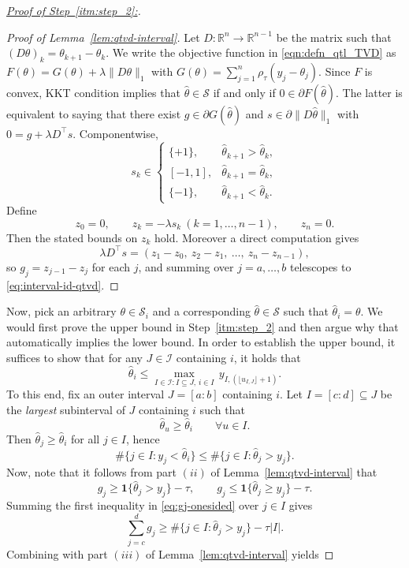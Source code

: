 \documentclass[11pt]{article}
\newcommand{\R}{\mathbb{R}}
\newcommand{\one}{\mathbf 1}
\newcommand{\I}{\mathcal{I}}
\newcommand{\cI}{\mathcal{I}}
\newcommand{\cS}{\mathcal{S}}
\theoremstyle{plain}
\theoremstyle{definition}
\theoremstyle{remark}
\begin{document}
\begin{proof}[\underline{Proof of Step~\ref{itm:step_2}:}]
\begin{proof}[Proof of Lemma~\ref{lem:qtvd-interval}]
Let $D:\R^n\to\R^{n-1}$ be the matrix such that $(D\theta)_k=\theta_{k+1}-\theta_k$. We write the objective function in \eqref{eqn:defn_qtl_TVD} as
$F(\theta)=G(\theta)+\lambda\|D\theta\|_1$ with
$G(\theta)=\sum_{j=1}^n\rho_\tau(y_j-\theta_j)$. Since $F$ is convex, KKT condition implies that $\hat{\theta}\in \cS$ if and only if $0\in\partial F(\hat\theta)$. The latter is equivalent to saying that there exist
$g\in\partial G(\hat\theta)$ and $s\in\partial\|D\hat\theta\|_1$ with $0=g+\lambda D^\top s$.
Componentwise,
\[
s_k\in
\begin{cases}
\{+1\}, & \hat\theta_{k+1}>\hat\theta_k,\\
[-1,1], & \hat\theta_{k+1}=\hat\theta_k,\\
\{-1\}, & \hat\theta_{k+1}<\hat\theta_k.
\end{cases}
\]
Define
\[
z_0=0,\qquad z_k=-\lambda s_k\ (k=1,\dots,n-1),\qquad z_n=0.
\]
Then the stated bounds on $z_k$ hold. Moreover a direct computation gives
\[
\lambda D^\top s=(z_1-z_0,\ z_2-z_1,\ \dots,\ z_n-z_{n-1}),
\]
so $g_j=z_{j-1}-z_j$ for each $j$, and summing over $j=a,\dots,b$ telescopes to \eqref{eq:interval-id-qtvd}.
\end{proof}
 Now, pick an arbitrary $\theta\in \cS_i$ and a corresponding $\hat{\theta}\in \cS$ such that $\hat{\theta}_i=\theta$. We would first prove the upper bound in Step~\ref{itm:step_2} and then argue why that automatically implies the lower bound. In order to establish the upper bound, it suffices to show that for any $J\in \cI$ containing $i$, it holds that
 \[\hat{\theta}_i\leq \max_{I\in \I: I\subseteq J,\, i \in I}\, y_{I,(\lfloor u_{I,J}\rfloor+1)}.\]
 To this end, fix an outer interval $J=[a:b]$ containing $i$.
Let $I=[c:d]\subseteq J$ be the \emph{largest} subinterval of $J$ containing $i$ such that
\[
\hat\theta_u\ge \hat\theta_i\qquad \forall u\in I.
\]
Then $\hat\theta_j\ge \hat\theta_i$ for all $j\in I$, hence
\[
\#\{j\in I: y_j<\hat\theta_i\} \le \#\{j\in I:\hat\theta_j>y_j\}.
\]
Now, note that it follows from part $(ii)$ of Lemma~\ref{lem:qtvd-interval} that
\begin{equation}\label{eq:gj-onesided}
g_j \ge \one\{\hat\theta_j>y_j\}-\tau,
\qquad
g_j \le \one\{\hat\theta_j\ge y_j\}-\tau.
\end{equation}
Summing the first inequality in \eqref{eq:gj-onesided} over $j\in I$ gives
\[
\sum_{j=c}^d g_j \ge \#\{j\in I:\hat\theta_j>y_j\}-\tau|I|.
\]
Combining with part $(iii)$ of Lemma~\ref{lem:qtvd-interval} yields

\end{proof}
\end{document}
